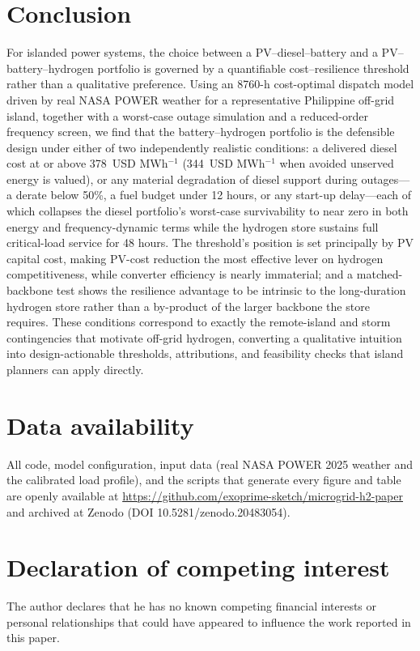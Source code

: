 \documentclass[preprint,12pt]{elsarticle}
\begin{document}
\section{Conclusion}
\label{sec:concl}

For islanded power systems, the choice between a PV--diesel--battery and a
PV--battery--hydrogen portfolio is governed by a quantifiable cost--resilience
threshold rather than a qualitative preference. Using an 8760-h cost-optimal
dispatch model driven by real NASA POWER weather for a representative Philippine
off-grid island, together with a worst-case outage simulation and a reduced-order
frequency screen, we find that the battery--hydrogen portfolio is the defensible
design under either of two independently realistic conditions: a delivered diesel
cost at or above 378~USD MWh$^{-1}$ (344~USD MWh$^{-1}$ when avoided unserved energy
is valued), or any material degradation of diesel support during outages---a derate
below 50\%, a fuel budget under 12 hours, or any start-up delay---each of which
collapses the diesel portfolio's worst-case survivability to near zero in both
energy and frequency-dynamic terms while the hydrogen store sustains full
critical-load service for 48 hours. The threshold's position is set principally by
PV capital cost, making PV-cost reduction the most effective lever on hydrogen
competitiveness, while converter efficiency is nearly immaterial; and a
matched-backbone test shows the resilience advantage to be intrinsic to the
long-duration hydrogen store rather than a by-product of the larger backbone the
store requires. These conditions correspond to exactly the remote-island and storm
contingencies that motivate off-grid hydrogen, converting a qualitative intuition
into design-actionable thresholds, attributions, and feasibility checks that island
planners can apply directly.

\section*{Data availability}
All code, model configuration, input data (real NASA POWER 2025 weather and the
calibrated load profile), and the scripts that generate every figure and table are
openly available at \url{https://github.com/exoprime-sketch/microgrid-h2-paper} and
archived at Zenodo (DOI 10.5281/zenodo.20483054).

\section*{Declaration of competing interest}
The author declares that he has no known competing financial interests or personal
relationships that could have appeared to influence the work reported in this paper.
\end{document}

